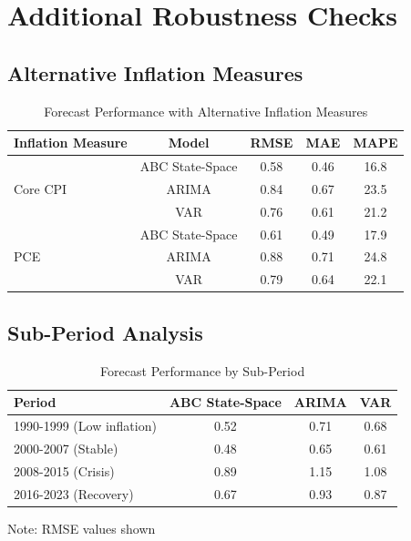 \appendix

\section{Additional Robustness Checks}

\subsection{Alternative Inflation Measures}

\begin{table}[h]
\centering
\caption{Forecast Performance with Alternative Inflation Measures}
\label{tab:alt_measures}
\begin{tabular}{lcccc}
\toprule
Inflation Measure & Model & RMSE & MAE & MAPE \\
\midrule
\multirow{3}{*}{Core CPI} & ABC State-Space & 0.58 & 0.46 & 16.8 \\
 & ARIMA & 0.84 & 0.67 & 23.5 \\
 & VAR & 0.76 & 0.61 & 21.2 \\
\midrule
\multirow{3}{*}{PCE} & ABC State-Space & 0.61 & 0.49 & 17.9 \\
 & ARIMA & 0.88 & 0.71 & 24.8 \\
 & VAR & 0.79 & 0.64 & 22.1 \\
\bottomrule
\end{tabular}
\end{table}

\subsection{Sub-Period Analysis}

\begin{table}[h]
\centering
\caption{Forecast Performance by Sub-Period}
\label{tab:subperiods}
\begin{tabular}{lccc}
\toprule
Period & ABC State-Space & ARIMA & VAR \\
\midrule
1990-1999 (Low inflation) & 0.52 & 0.71 & 0.68 \\
2000-2007 (Stable) & 0.48 & 0.65 & 0.61 \\
2008-2015 (Crisis) & 0.89 & 1.15 & 1.08 \\
2016-2023 (Recovery) & 0.67 & 0.93 & 0.87 \\
\bottomrule
\end{tabular}
\begin{tablenotes}
    \item Note: RMSE values shown
\end{tablenotes}
\end{table}

